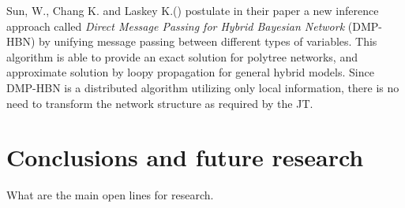 \documentclass[a4paper,11pt]{article}
\begin{document}
 Sun, W., Chang K. and Laskey K.(\cite{scalable2010}) postulate in their paper a new inference approach called \textit{Direct Message Passing for Hybrid Bayesian Network} (DMP-HBN) by unifying message passing between different types of variables. This algorithm is able to provide an exact solution for polytree networks, and approximate solution by loopy propagation for general hybrid models. 
Since DMP-HBN is a distributed algorithm utilizing only local information, there is no need to transform the network structure as required by the JT.

\section{Conclusions and future research}

What are the main open lines for research.
\end{document}
